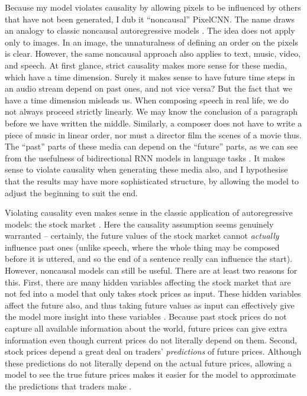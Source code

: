 \documentclass[11pt, a4paper, openany]{book}
\newcommand{\nquote}[1]{``{#1}''}
\begin{document}
Because my model violates causality by allowing pixels to be influenced by others that have not been generated, I dub it \nquote{noncausal} PixelCNN. The name draws an analogy to classic noncausal autoregressive models \citep{noncausalimage2,noncausaleco2}. The idea does not apply only to images. In an image, the unnaturalness of defining an order on the pixels is clear. However, the same noncausal approach also applies to text, music, video, and speech. At first glance, strict causality makes more sense for these media, which have a time dimension. Surely it makes sense to have future time steps in an audio stream depend on past ones, and not vice versa? But the fact that we have a time dimension misleads us. When composing speech in real life, we do not always proceed strictly linearly. We may know the conclusion of a paragraph before we have written the middle. Similarly, a composer does not have to write a piece of music in linear order, nor must a director film the scenes of a movie thus. The \nquote{past} parts of these media can depend on the \nquote{future} parts, as we can see from the usefulness of bidirectional RNN models in language tasks \citep{brnnuse1,brnnuse2,brnnuse3}. It makes sense to violate causality when generating these media also, and I hypothesise that the results may have more sophisticated structure, by allowing the model to adjust the beginning to suit the end.

Violating causality even makes sense in the classic application of autoregressive models: the stock market \citep{noncausaleco1}. Here the causality assumption seems genuinely warranted -- certainly, the future values of the stock market cannot \emph{actually} influence past ones (unlike speech, where the whole thing may be composed before it is uttered, and so the end of a sentence really can influence the start). However, noncausal models can still be useful. There are at least two reasons for this. First, there are many hidden variables affecting the stock market that are not fed into a model that only takes stock prices as input. These hidden variables affect the future also, and thus taking future values as input can effectively give the model more insight into these variables \citep{noncausaleco1}. Because past stock prices do not capture all available information about the world, future prices can give extra information even though current prices do not literally depend on them. Second, stock prices depend a great deal on traders' \emph{predictions} of future prices. Although these predictions do not literally depend on the actual future prices, allowing a model to see the true future prices makes it easier for the model to approximate the predictions that traders make \citep{noncausaleco1}.
\end{document}

